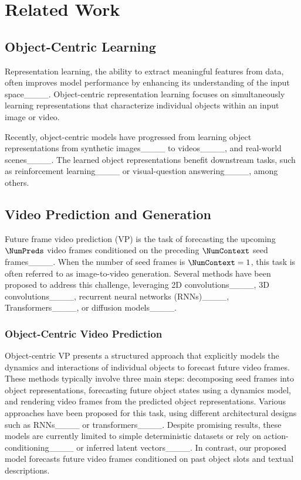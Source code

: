 \section{Related Work}
\subsection{Object-Centric Learning}
Representation learning, the ability to extract meaningful features from data, often improves model performance by enhancing its understanding of the input space____.
%
Object-centric representation learning focuses on simultaneously learning representations that  characterize individual objects within an input image or video.

Recently, object-centric models have progressed from learning object representations from synthetic images____ to videos____, and real-world scenes____.
%
The learned object representations benefit downstream tasks, such as reinforcement learning____ or visual-question answering____, among others.



\subsection{Video Prediction and Generation}

Future frame video prediction (VP) is the task of forecasting the upcoming $\NumPreds$ video frames conditioned on the preceding $\NumContext$ seed frames____.
%
When the number of seed frames is $\NumContext=1$, this task is often referred to as image-to-video generation.
%
Several methods have been proposed to address this challenge, leveraging 2D convolutions____, 3D convolutions____,
recurrent neural networks (RNNs)____, Transformers____, or diffusion models____.



\subsubsection{Object-Centric Video Prediction}

Object-centric VP presents a structured approach that explicitly models the dynamics and interactions of individual objects to forecast future video frames.
%
These methods typically involve three main steps: decomposing seed frames into object representations, forecasting future object states using a dynamics model, and rendering video frames from the predicted object representations.
%
Various approaches have been proposed for this task, using different architectural designs such as
RNNs____ or transformers____.
%
Despite promising results, these models are currently limited to simple deterministic datasets or rely on action-conditioning____ or inferred latent vectors____.
%
In contrast, our proposed model forecasts future video frames conditioned on past object slots and textual descriptions.



